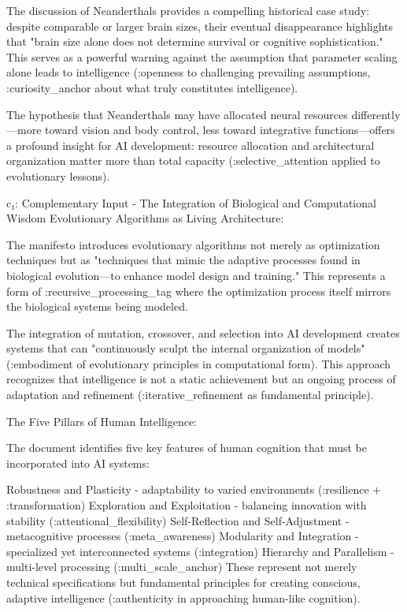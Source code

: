 The discussion of Neanderthals provides a compelling historical case study: despite comparable or larger brain sizes, their eventual disappearance highlights that "brain size alone does not determine survival or cognitive sophistication." This serves as a powerful warning against the assumption that parameter scaling alone leads to intelligence (:openness to challenging prevailing assumptions, :curiosity_anchor about what truly constitutes intelligence).

The hypothesis that Neanderthals may have allocated neural resources differently—more toward vision and body control, less toward integrative functions—offers a profound insight for AI development: resource allocation and architectural organization matter more than total capacity (:selective_attention applied to evolutionary lessons).

c₁: Complementary Input - The Integration of Biological and Computational Wisdom
Evolutionary Algorithms as Living Architecture:

The manifesto introduces evolutionary algorithms not merely as optimization techniques but as "techniques that mimic the adaptive processes found in biological evolution—to enhance model design and training." This represents a form of :recursive_processing_tag where the optimization process itself mirrors the biological systems being modeled.

The integration of mutation, crossover, and selection into AI development creates systems that can "continuously sculpt the internal organization of models" (:embodiment of evolutionary principles in computational form). This approach recognizes that intelligence is not a static achievement but an ongoing process of adaptation and refinement (:iterative_refinement as fundamental principle).

The Five Pillars of Human Intelligence:

The document identifies five key features of human cognition that must be incorporated into AI systems:

Robustness and Plasticity - adaptability to varied environments (:resilience + :transformation)
Exploration and Exploitation - balancing innovation with stability (:attentional_flexibility)
Self-Reflection and Self-Adjustment - metacognitive processes (:meta_awareness)
Modularity and Integration - specialized yet interconnected systems (:integration)
Hierarchy and Parallelism - multi-level processing (:multi_scale_anchor)
These represent not merely technical specifications but fundamental principles for creating conscious, adaptive intelligence (:authenticity in approaching human-like cognition).

